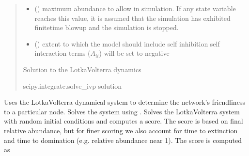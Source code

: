 \documentclass[letterpaper,10pt,english]{sphinxmanual}
\begin{document}
\begin{fulllineitems}
\begin{fulllineitems}
\begin{quote}
\begin{description}
\begin{itemize}
\item {} 
\sphinxAtStartPar
{} () \textendash{} maximum abundance to allow in simulation. If any state variable reaches this value, it is assumed that the simulation has exhibited finite\sphinxhyphen{}time blowup and the simulation is stopped.

\item {} 
\sphinxAtStartPar
{} () \textendash{} extent to which the model should include self inhibition \sphinxhyphen{} self interaction terms (\(A_{ii}\)) will be set to negative 

\end{itemize}

\sphinxAtStartPar
Solution to the Lotka\sphinxhyphen{}Volterra dynamics

\sphinxAtStartPar
scipy.integrate.solve\_ivp solution

\end{description}\end{quote}

\end{fulllineitems}


\begin{fulllineitems}
\label{\detokenize{friendlynets:friendlyNet.friendlyNet.lotka_volterra_score_single}}
\pysigstartsignatures
{}
\pysigstopsignatures
\sphinxAtStartPar
Uses the Lotka\sphinxhyphen{}Volterra dynamical system to determine the network’s friendliness to a particular node. Solves the system using {\hyperref[\detokenize{friendlynets:friendlyNet.friendlyNet.solve_lotka_volterra}]{}}.
Solves the Lotka\sphinxhyphen{}Volterra system with random initial conditions and computes a score. The score is based on final relative abundance, but for finer scoring we also account for time to extinction
and time to domination (e.g. relative abundance near 1). The score is computed as


\end{fulllineitems}
\end{fulllineitems}
\end{document}
